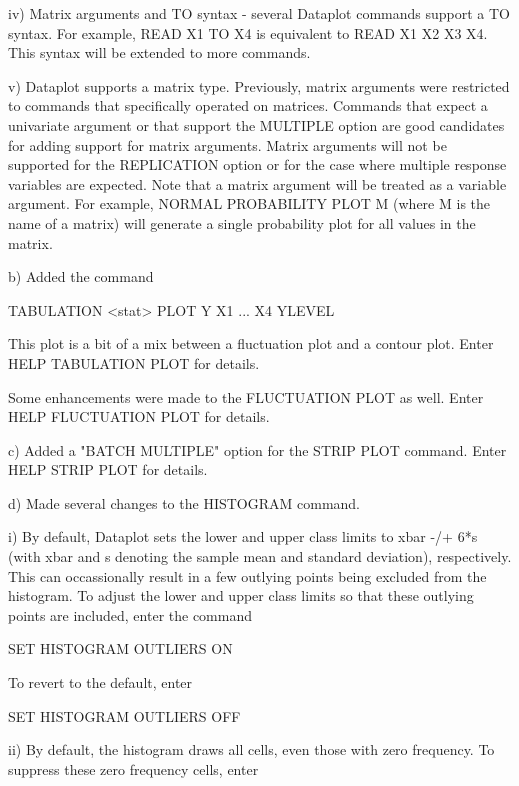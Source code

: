 {         iv) Matrix arguments and TO syntax - several Dataplot
             commands support a TO syntax.  For example,
             READ X1 TO X4 is equivalent to READ X1 X2 X3 X4.
             This syntax will be extended to more commands.

          v) Dataplot supports a matrix type.  Previously, matrix
             arguments were restricted to commands that specifically
             operated on matrices.  Commands that expect a
             univariate argument or that support the MULTIPLE 
             option are good candidates for adding support for
             matrix arguments.  Matrix arguments will not be
             supported for the REPLICATION option or for the case
             where multiple response variables are expected.
             Note that a matrix argument will be treated as a
             variable argument.  For example, NORMAL PROBABILITY PLOT M
             (where M is the name of a matrix) will generate a single 
             probability plot for all values in the matrix.

    b) Added the command

          TABULATION <stat> PLOT Y X1 ... X4  YLEVEL

       This plot is a bit of a mix between a fluctuation plot
       and a contour plot.  Enter HELP TABULATION PLOT for
       details.

       Some enhancements were made to the FLUCTUATION PLOT
       as well.  Enter HELP FLUCTUATION PLOT for details.

    c) Added a "BATCH MULTIPLE" option for the STRIP PLOT
       command.  Enter HELP STRIP PLOT for details.

    d) Made several changes to the HISTOGRAM command.

         i) By default, Dataplot sets the lower and upper class limits
            to xbar -/+ 6*s (with xbar and s denoting the sample mean
            and standard deviation), respectively.  This can
            occassionally result in a few outlying points being excluded
            from the histogram.  To adjust the lower and upper class
            limits so that these outlying points are included, enter the
            command

                 SET HISTOGRAM OUTLIERS ON

            To revert to the default, enter

                 SET HISTOGRAM OUTLIERS OFF

        ii) By default, the histogram draws all cells, even those with
            zero frequency.  To suppress these zero frequency cells,
            enter

}
